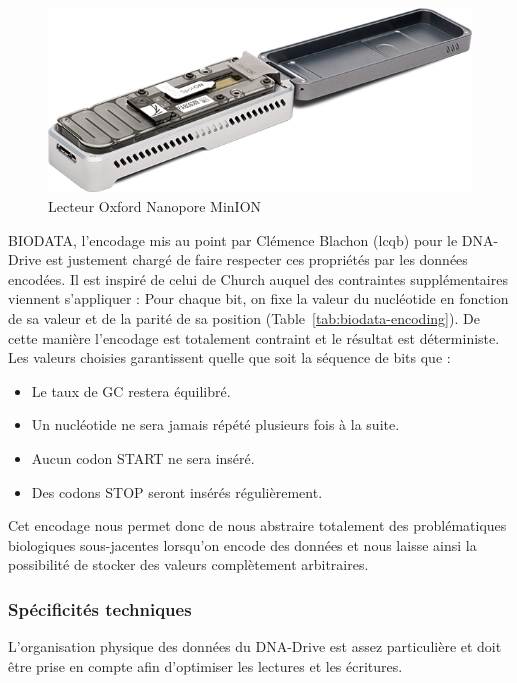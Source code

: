 \documentclass[a4paper]{report}
\begin{document}
\begin{figure}[ht]
\centering
\includegraphics[width=.6\textwidth]{oxford-nanopore-minion}
\caption{Lecteur Oxford Nanopore MinION}
\label{fig:oxford-nanopore-minion}
\end{figure}

BIODATA, l'encodage mis au point par Clémence Blachon (\ac{lcqb}) pour le DNA-Drive est justement chargé de faire respecter ces propriétés par les données encodées.
Il est inspiré de celui de Church auquel des contraintes supplémentaires viennent s'appliquer :
Pour chaque bit, on fixe la valeur du nucléotide en fonction de sa valeur et de la parité de sa position (Table~\ref{tab:biodata-encoding}).
De cette manière l'encodage est totalement contraint et le résultat est déterministe.
Les valeurs choisies garantissent quelle que soit la séquence de bits que :

\begin{itemize}
  \item Le taux de GC restera équilibré.
  \item Un nucléotide ne sera jamais répété plusieurs fois à la suite.
  \item Aucun codon START ne sera inséré.
  \item Des codons STOP seront insérés régulièrement.
\end{itemize}

Cet encodage nous permet donc de nous abstraire totalement des problématiques biologiques sous-jacentes lorsqu'on encode des données
et nous laisse ainsi la possibilité de stocker des valeurs complètement arbitraires.

\subsubsection{Spécificités techniques}

L'organisation physique des données du DNA-Drive est assez particulière et doit être prise en compte afin d'optimiser les lectures et les écritures.
\end{document}
